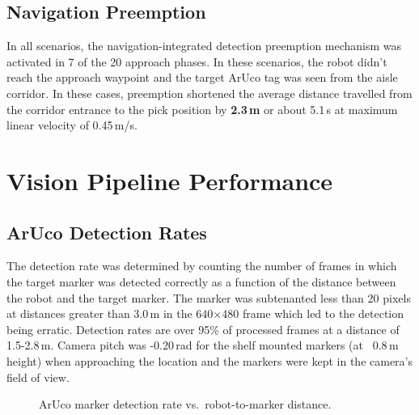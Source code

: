 \documentclass[12pt,a4paper]{report}
\begin{document}
\subsection{Navigation Preemption}

In all scenarios, the navigation-integrated detection preemption mechanism was activated in 7 of the 20 approach phases. In these scenarios, the robot didn't reach the approach waypoint and the target ArUco tag was seen from the aisle corridor. In these cases, preemption shortened the average distance travelled from the corridor entrance to the pick position by \textbf{2.3\,m} or about 5.1\,s at maximum linear velocity of 0.45\,m/s.

\section{Vision Pipeline Performance}

\subsection{ArUco Detection Rates}

The detection rate was determined by counting the number of frames in which the target marker was detected correctly as a function of the distance between the robot and the target marker. The marker was subtenanted less than 20 pixels at distances greater than 3.0\,m in the 640$\times$480 frame which led to the detection being erratic. Detection rates are over 95\% of processed frames at a distance of 1.5-2.8\,m. Camera pitch was -0.20\,rad for the shelf mounted markers (at ~0.8\,m height) when approaching the location and the markers were kept in the camera's field of view.

\begin{figure}[H]
\centering
{}
\caption{ArUco marker detection rate vs.\ robot-to-marker distance.}
\label{fig:detection_rate}
\end{figure}
\end{document}
